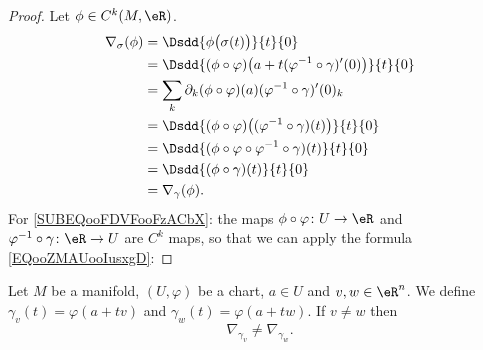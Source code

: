 \begin{proof}
	Let \( \phi\in C^k(M, \eR)\).
	\begin{subequations}
		\begin{align}
			\nabla_{\sigma}(\phi) & =\Dsdd{ \phi\big( \sigma(t) \big) }{t}{0}                                                          \\
			                      & =\Dsdd{ (\phi\circ \varphi)\big( a+t(\varphi^{-1}\circ\gamma)'(0) \big) }{t}{0}                    \\
			                      & =\sum_k\partial_k(\phi\circ\varphi)(a)(\varphi^{-1}\circ\gamma)'(0)_k  \label{SUBEQooFDVFooFzACbX} \\
			                      & =\Dsdd{ (\phi\circ\varphi)\big( (\varphi^{-1}\circ\gamma)(t) \big) }{t}{0}                         \\
			                      & =\Dsdd{ (\phi\circ\varphi\circ\varphi^{-1}\circ\gamma)(t) }{t}{0}                                  \\
			                      & =\Dsdd{ (\phi\circ\gamma)(t) }{t}{0}                                                               \\
			                      & =\nabla_{\gamma}(\phi).
		\end{align}
	\end{subequations}
	For \eqref{SUBEQooFDVFooFzACbX}: the maps \( \phi\circ\varphi\colon U\to \eR\) and \( \varphi^{-1}\circ\gamma\colon \eR\to U\) are \( C^k\) maps, so that we can apply the formula \eqref{EQooZMAUooIusxgD}:
\end{proof}

\begin{lemma}       \label{LEMooGPCBooXMTddG}
	Let \( M\) be a manifold, \( (U,\varphi)\) be a chart, \( a\in U\) and \( v,w\in \eR^n\). We define \( \gamma_v(t)=\varphi(a+tv)\) and \( \gamma_w(t)=\varphi(a+tw)\). If \( v\neq w\) then
	\begin{equation}
		\nabla_{\gamma_v}\neq \nabla_{\gamma_w}.
	\end{equation}
\end{lemma}

